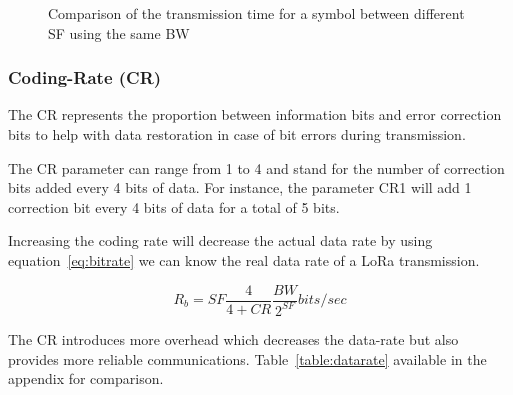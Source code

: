\begin{figure}[H]
\centering
{}
\caption{Comparison of the transmission time for a symbol between different SF
  using the same BW\label{fig:sfcomp}}
\end{figure}

\subsubsection{Coding-Rate (CR)}

The CR represents the proportion between information bits and error
correction bits to help with data restoration in case of bit errors
during transmission.

The CR parameter can range from 1 to 4 and stand for the number of correction
bits added every 4 bits of data.
For instance, the parameter CR1 will add 1 correction bit every 4 bits of data
for a total of 5 bits.

Increasing the coding rate will decrease the actual data rate by using
equation~\ref{eq:bitrate} we can know the real data rate of a LoRa transmission.

\begin{equation}
 \label{eq:datarate}
  R_{b} = SF \frac{4}{4 + CR} \frac{BW}{2^{SF}} bits/sec
\end{equation}

The CR introduces more overhead which decreases the data-rate but also
provides more reliable communications.
Table~\ref{table:datarate} available in the appendix for comparison.


